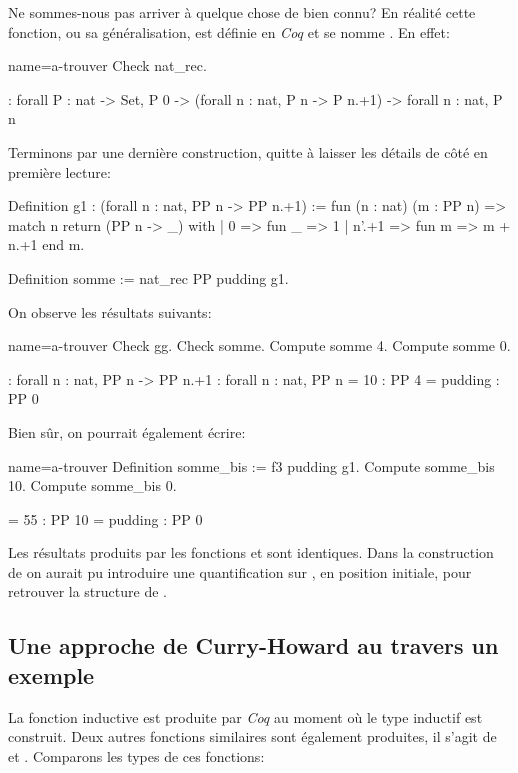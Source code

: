 \documentclass[a4paper,10pt]{article}
\begin{document}
Ne sommes-nous pas arriver à quelque chose de bien connu?  En réalité cette fonction, ou sa généralisation,
est définie en \emph{Coq} et se nomme .  En effet:

\begin{coq-left}{name=a-trouver}{}
Check nat_rec.
\end{coq-left}
\hfill
\begin{coqout-right}
: forall P : nat -> Set, P 0 ->
  (forall n : nat, P n -> P n.+1) ->
  forall n : nat, P n
\end{coqout-right}

Terminons par une dernière construction, quitte à laisser les détails de côté en première lecture:

\begin{coq}[]
Definition g1 : (forall n : nat, PP n -> PP n.+1) := fun (n : nat) (m : PP n) =>
  match n return (PP n -> _) with
  | 0 => fun _ => 1
  | n'.+1 => fun m => m + n.+1
  end m.

Definition somme := nat_rec PP pudding g1.
\end{coq}

On observe les résultats suivants:

\begin{coq-left}{name=a-trouver}{}
Check gg.
Check somme.
Compute somme 4.
Compute somme 0.
\end{coq-left}
\hfill
\begin{coqout-right}
: forall n : nat, PP n -> PP n.+1
: forall n : nat, PP n
= 10 : PP 4
= pudding : PP 0
\end{coqout-right}

Bien sûr, on pourrait également écrire:

\begin{coq-left}{name=a-trouver}{}
Definition somme_bis := f3 pudding g1.
Compute somme_bis 10.
Compute somme_bis 0.
\end{coq-left}
\hfill
\begin{coqout-right}

= 55 : PP 10
= pudding : PP 0
\end{coqout-right}

Les résultats produits par les fonctions  et  sont identiques.  Dans la construction
de  on aurait pu introduire une quantification sur , en position initiale, pour retrouver la
structure de .

\subsection{Une approche de Curry-Howard au travers un exemple}
\label{sec:org517cdbc}
La fonction inductive  est produite par \emph{Coq} au moment où le type inductif est construit.  Deux
autres fonctions similaires sont également produites, il s'agit de  et .  Comparons
les types de ces fonctions:
\end{document}
